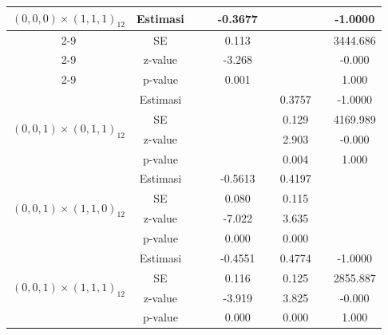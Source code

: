 \begin{enumerate}[label=\alph*.]
\begin{longtable}{|c|c|c|c|c|c|c|c|c|}
            \multirow{4}{*}{$(0,0,0)\times(1,1,1)_{12}$}
            & Estimasi & {} & {} & -0.3677 & {} & {} & {} & -1.0000\\ \cline{2-9}
            & SE       & {} & {} & 0.113 & {} & {} & {} & 3444.686\\ \cline{2-9}
            & z-value  & {} & {} & -3.268 & {}   & {}   & {} & -0.000\\ \cline{2-9}
            & p-value  & {} & {} & 0.001 & {} & {} & {} & 1.000\\ \hline

            \multirow{4}{*}{$(0,0,1)\times(0,1,1)_{12}$}
            & Estimasi & {} & {} & {} & {} & 0.3757 & {} & -1.0000 \\ \cline{2-9}
            & SE       & {} & {} & {} & {} & 0.129 & {} & 4169.989\\ \cline{2-9}
            & z-value  & {} & {} & {} & {} & 2.903 & {} & -0.000\\ \cline{2-9}
            & p-value  & {} & {} & {} & {} & 0.004 & {} & 1.000\\ \hline

            \multirow{4}{*}{$(0,0,1)\times(1,1,0)_{12}$}
            & Estimasi & {} & {} & -0.5613 & {}  & 0.4197 & {} & {}\\ \cline{2-9}
            & SE       & {} & {} & 0.080 & {} & 0.115 & {} & {}\\ \cline{2-9}
            & z-value  & {} & {} & -7.022 & {} & 3.635 & {} & {}\\ \cline{2-9}
            & p-value  & {} & {} & 0.000 & {} & 0.000 & {} & {} \\ \hline

            \multirow{4}{*}{$(0,0,1)\times(1,1,1)_{12}$}
            & Estimasi & {} & {} & -0.4551 & {} & 0.4774 & {} & -1.0000 \\ \cline{2-9}
            & SE       & {} & {} &  0.116   & {} & 0.125 & {} & 2855.887\\ \cline{2-9}
            & z-value  & {} & {} & -3.919  & {} & 3.825 & {} & -0.000\\ \cline{2-9}
            & p-value  & {} & {} & 0.000   & {} & 0.000 & {} & 1.000 \\ \hline


\end{longtable}
\end{enumerate}
